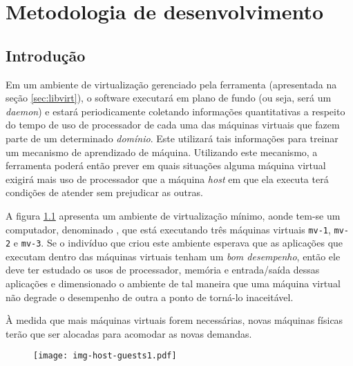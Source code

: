%
%
%
% 
%
%

\chapter{Metodologia de desenvolvimento}\label{sec:meto}

\section{Introdução}

Em um ambiente de virtualização gerenciado pela ferramenta \libvirt{}
(apresentada na seção \ref{sec:libvirt}), o software executará em plano de
fundo (ou seja, será um \emph{daemon}) e estará periodicamente coletando
informações quantitativas a respeito do tempo de uso de processador de
cada uma das máquinas virtuais que fazem parte de um determinado
\emph{domínio}. Este utilizará tais informações para treinar um
mecanismo de aprendizado de máquina. Utilizando este mecanismo, a
ferramenta poderá então prever em quais situações alguma máquina virtual
exigirá mais uso de processador que a máquina \emph{host} em que ela
executa terá condições de atender sem prejudicar as outras.

A figura \ref{fig:hostguests1} apresenta um ambiente de virtualização
mínimo, aonde tem-se um computador, denominado , que está
executando três máquinas virtuais \texttt{mv-1}, \texttt{mv-2} e
\texttt{mv-3}. Se o indivíduo que criou este ambiente esperava que as
aplicações que executam dentro das máquinas virtuais tenham um \emph{bom
desempenho}, então ele deve ter estudado os usos de processador, memória e
entrada/saída dessas aplicações e dimensionado o ambiente de tal maneira
que uma máquina virtual não degrade o desempenho de outra a ponto de
torná-lo inaceitável.

À medida que mais máquinas virtuais forem necessárias, novas máquinas
físicas terão que ser alocadas para acomodar as novas demandas.

\begin{figure}
\centering
\texttt{[image: img-host-guests1.pdf]}
\label{fig:hostguests1}
\end{figure}

